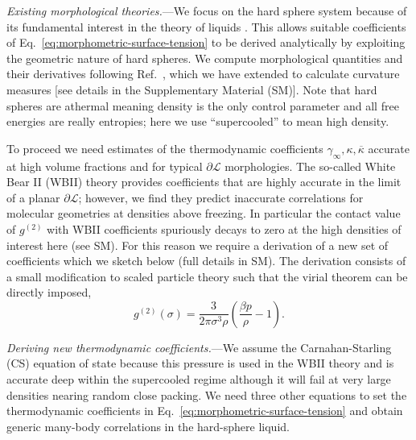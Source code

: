 \documentclass[11pt,twoside]{report}
\begin{document}
\emph{Existing morphological theories.}---We focus on the hard sphere system because of its fundamental interest in the theory of liquids \cite{Widom1967,Hansen2013}.
This allows suitable coefficients of Eq.\ \eqref{eq:morphometric-surface-tension} to be derived analytically by exploiting the geometric nature of hard spheres.
We compute morphological quantities and their derivatives following Ref.\ \cite{Klenin2011}, which we have extended to calculate curvature measures [see details in the Supplementary Material (SM)].
Note that hard spheres are athermal meaning density is the only control parameter and all free energies are really entropies; here we use ``supercooled'' to mean high density.

To proceed we need estimates of the thermodynamic coefficients $\gamma_\infty,\kappa,\overline{\kappa}$ accurate at high volume fractions and for typical $\partial\mathcal{L}$ morphologies.
The so-called White Bear II (WBII) theory provides coefficients \cite{Hansen-Goos2006} that are highly accurate in the limit of a planar $\partial\mathcal{L}$; however, we find they predict inaccurate correlations for molecular geometries at densities above freezing.
In particular the contact value of $g^{(2)}$ with WBII coefficients spuriously decays to zero at the high densities of interest here (see SM).
For this reason we require a derivation of a new set of coefficients which we sketch below (full details in SM).
The derivation consists of a small modification to scaled particle theory  \cite{Reiss1959,Reiss1960} such that the virial theorem can be directly imposed,
\begin{equation}\label{eq:contact-g}
  g^{(2)}(\sigma) =
  \frac{3}{2\pi \sigma^3 \rho} \left( \frac{\beta p}{\rho} - 1 \right).
\end{equation}

\emph{Deriving new thermodynamic coefficients.}---We assume the Carnahan-Starling (CS) equation of state \cite{Carnahan1969} because this pressure is used in the WBII theory and is accurate deep within the supercooled regime \cite{Berthier2016} although it will fail at very large densities nearing random close packing.
We need three other equations to set the thermodynamic coefficients in Eq.\ \eqref{eq:morphometric-surface-tension} and obtain generic many-body correlations in the hard-sphere liquid.
\end{document}
